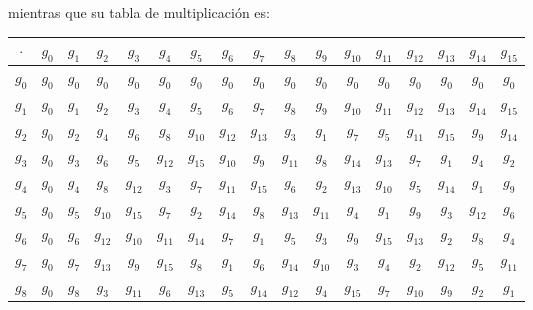\documentclass[letterpaper,11pt]{article}
\begin{document}
\begin{enumerate}
    \newpage
    mientras que su tabla de multiplicación es:
    \begin{table}[h]
    \begin{center}
    \begin{tabular}{|c|c|c|c|c|c|c|c|c|c|c|c|c|c|c|c|c|}
    \hline
    $\cdot$ & $g_{0}$ & $g_{1}$ & $g_{2}$ & $g_{3}$ & $g_{4}$ &
    $g_{5}$ & $g_{6}$ & $g_{7}$ & $g_{8}$ & $g_{9}$ & 
    $g_{10}$ & $g_{11}$ & $g_{12}$ & $g_{13}$ & $g_{14}$ & 
    $g_{15}$ \\ \hline
    $g_{0}$ & $g_{0}$ & $g_{0}$ & $g_{0}$ & $g_{0}$ & 
    $g_{0}$ & $g_{0}$ & $g_{0}$ & $g_{0}$ & $g_{0}$ & $g_{0}$  
    & $g_{0}$ & $g_{0}$ & $g_{0}$ & $g_{0}$ & $g_{0}$ & 
    $g_{0}$ \\ \hline
    $g_{1}$ & $g_{0}$ & $g_{1}$ & $g_{2}$ & $g_{3}$ & 
    $g_{4}$ & $g_{5}$ & $g_{6}$ & $g_{7}$ & $g_{8}$ & 
    $g_{9}$ & $g_{10}$ & $g_{11}$ & $g_{12}$ & $g_{13}$ & 
    $g_{14}$ & $g_{15}$ \\ \hline
    $g_{2}$ & $g_{0}$ & $g_{2}$ & $g_{4}$ & $g_{6}$ & $g_{8}$ & $g_{10}$ & 
    $g_{12}$ & $g_{13}$ & $g_{3}$ & $g_{1}$ & $g_{7}$ & $g_{5}$ & $g_{11}$ & 
    $g_{15}$& $g_{9}$ & $g_{14}$ \\ \hline
    $g_{3}$ & $g_{0}$ & $g_{3}$ & $g_{6}$ & $g_{5}$ & $g_{12}$ & $g_{15}$ & 
    $g_{10}$ & $g_{9}$ & $g_{11}$ & $g_{8}$ & $g_{14}$ & $g_{13}$ & $g_{7}$ & 
    $g_{1}$ & $g_{4}$ & $g_{2}$ \\ \hline
    $g_{4}$ & $g_{0}$ & $g_{4}$ & $g_{8}$ & $g_{12}$ & $g_{3}$ & $g_{7}$ & 
    $g_{11}$ & $g_{15}$ & $g_{6}$ & $g_{2}$ & $g_{13}$ & $g_{10}$ & $g_{5}$ & 
    $g_{14}$ & $g_{1}$ & $g_{9}$ \\ \hline
    $g_{5}$ & $g_{0}$ & $g_{5}$ & $g_{10}$ & $g_{15}$ & $g_{7}$ & $g_{2}$ & 
    $g_{14}$ & $g_{8}$ & $g_{13}$ & $g_{11}$ & $g_{4}$ & $g_{1}$ & $g_{9}$ & 
    $g_{3}$ & $g_{12}$ & $g_{6}$ \\\hline
    $g_{6}$ & $g_{0}$ & $g_{6}$ & $g_{12}$ & $g_{10}$ & $g_{11}$ & $g_{14}$ & 
    $g_{7}$ & $g_{1}$ & $g_{5}$ & $g_{3}$ & $g_{9}$ & $g_{15}$ & $g_{13}$ & 
    $g_{2}$ & $g_{8}$ & $g_{4}$ \\\hline
    $g_{7}$ & $g_{0}$ & $g_{7}$ & $g_{13}$ & $g_{9}$ & $g_{15}$ & $g_{8}$ & 
    $g_{1}$ & $g_{6}$ & $g_{14}$ & $g_{10}$ & $g_{3}$ & $g_{4}$ & $g_{2}$ & 
    $g_{12}$ & $g_{5}$ & $g_{11}$ \\\hline
    $g_{8}$ & $g_{0}$ & $g_{8}$ & $g_{3}$ & $g_{11}$ & $g_{6}$ & $g_{13}$ & 
    $g_{5}$ & $g_{14}$ & $g_{12}$ & $g_{4}$ & $g_{15}$ & $g_{7}$ & $g_{10}$ & 
    $g_{9}$ & $g_{2}$ & $g_{1}$ \\ \hline

\end{tabular}
\end{center}
\end{table}
\end{enumerate}
\end{document}
